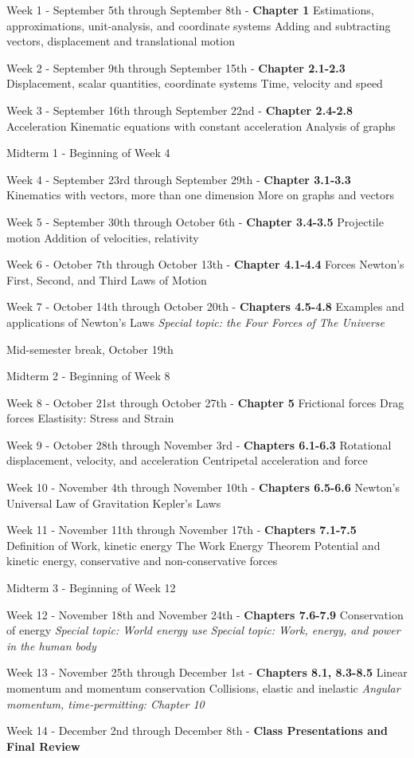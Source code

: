 \documentclass[10pt]{article}
\begin{document}
\begin{outline}[enumerate]
\1 Week 1 - September 5th through September 8th - \textbf{Chapter 1}
\2 Estimations, approximations, unit-analysis, and coordinate systems
\2 Adding and subtracting vectors, displacement and translational motion

\1 Week 2 - September 9th through September 15th - \textbf{Chapter 2.1-2.3}
\2 Displacement, scalar quantities, coordinate systems
\2 Time, velocity and speed

\1 Week 3 - September 16th through September 22nd - \textbf{Chapter 2.4-2.8}
\2 Acceleration
\2 Kinematic equations with constant acceleration
\2 Analysis of graphs

\1 Midterm 1 - Beginning of Week 4

\1 Week 4 - September 23rd through September 29th - \textbf{Chapter 3.1-3.3}
\2 Kinematics with vectors, more than one dimension
\2 More on graphs and vectors

\1 Week 5 - September 30th through October 6th - \textbf{Chapter 3.4-3.5}
\2 Projectile motion
\2 Addition of velocities, relativity

\1 Week 6 - October 7th through October 13th - \textbf{Chapter 4.1-4.4}
\2 Forces
\2 Newton's First, Second, and Third Laws of Motion

\1 Week 7 - October 14th through October 20th - \textbf{Chapters 4.5-4.8}
\2 Examples and applications of Newton's Laws
\2 \textit{Special topic: the Four Forces of The Universe}

\1 Mid-semester break, October 19th

\1 Midterm 2 - Beginning of Week 8

\1 Week 8 - October 21st through October 27th - \textbf{Chapter 5}
\2 Frictional forces
\2 Drag forces
\2 Elastisity: Stress and Strain

\1 Week 9 - October 28th through November 3rd - \textbf{Chapters 6.1-6.3}
\2 Rotational displacement, velocity, and acceleration
\2 Centripetal acceleration and force

\1 Week 10 - November 4th through November 10th - \textbf{Chapters 6.5-6.6}
\2 Newton's Universal Law of Gravitation
\2 Kepler's Laws

\1 Week 11 - November 11th through November 17th - \textbf{Chapters 7.1-7.5}
\2 Definition of Work, kinetic energy
\2 The Work Energy Theorem
\2 Potential and kinetic energy, conservative and non-conservative forces

\1 Midterm 3 - Beginning of Week 12

\1 Week 12 - November 18th and November 24th - \textbf{Chapters 7.6-7.9}
\2 Conservation of energy
\2 \textit{Special topic: World energy use}
\2 \textit{Special topic: Work, energy, and power in the human body}

\1 Week 13 - November 25th through December 1st  - \textbf{Chapters 8.1, 8.3-8.5}
\2 Linear momentum and momentum conservation
\2 Collisions, elastic and inelastic
\2 \textit{Angular momentum, time-permitting: Chapter 10}

\1 Week 14 - December 2nd through December 8th - \textbf{Class Presentations and Final Review}
\end{outline}
\end{document}
